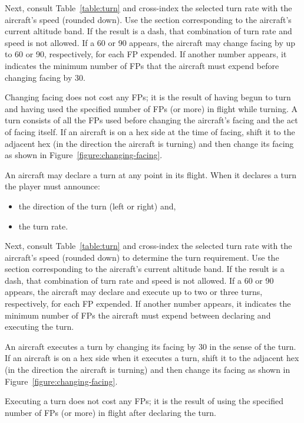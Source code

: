 {{Next, consult Table~\ref{table:turn} and cross-index the selected turn rate with the aircraft’s speed (rounded down). Use the section corresponding to the aircraft’s current altitude band. If the result is a dash, that combination of turn rate and speed is not allowed. 
If a 60 or 90 appears, the aircraft may change facing by up to 60{\deg} or 90{\deg}, respectively, for each FP expended.
If another number appears, it indicates the minimum number of FPs that the aircraft must expend before changing facing by 30{\deg}.

Changing facing does not cost any FPs; it is the result of having begun to turn and having used the specified number of FPs (or more) in flight while turning. A turn consists of all the FPs used before changing the aircraft’s facing and the act of facing itself. If an aircraft is on a hex side at the time of facing, shift it to the adjacent hex (in the direction the aircraft is turning) and then change its facing as shown in Figure~\ref{figure:changing-facing}.

}{
An aircraft may declare a turn at any point in its flight. When it declares a turn the player must announce:

\begin{itemize}
    \item the direction of the turn (left or right) and,
    \item the turn rate.
\end{itemize}

Next, consult Table~\ref{table:turn} and cross-index the selected turn rate with the aircraft’s speed (rounded down) to determine the turn requirement. Use the section corresponding to the aircraft’s current altitude band. If the result is a dash, that combination of turn rate and speed is not allowed. 
If a 60 or 90 appears, the aircraft may declare and execute up to two or three turns, respectively, for each FP expended.
If another number appears, it indicates the minimum number of FPs the aircraft must expend between declaring and executing the turn.

An aircraft executes a turn by changing its facing by 30{\deg} in the sense of the turn. If an aircraft is on a hex side when it executes a turn, shift it to the adjacent hex (in the direction the aircraft is turning) and then change its facing as shown in Figure~\ref{figure:changing-facing}. 

Executing a turn does not cost any FPs; it is the result of using the specified number of FPs (or more) in flight after declaring the turn.
}


}

